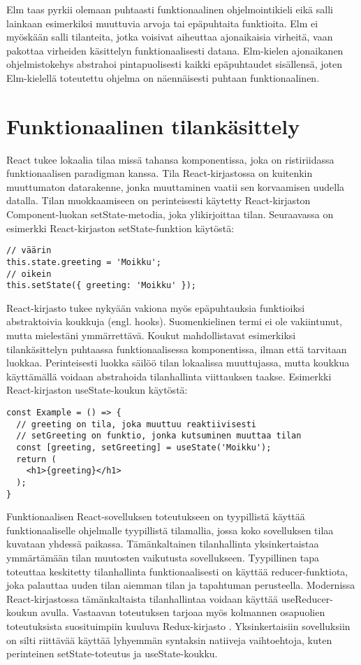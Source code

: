 Elm taas pyrkii olemaan puhtaasti funktionaalinen ohjelmointikieli eikä salli lainkaan esimerkiksi muuttuvia arvoja tai
epäpuhtaita funktioita. Elm ei myöskään salli tilanteita, jotka voisivat aiheuttaa ajonaikaisia virheitä, vaan pakottaa
virheiden käsittelyn funktionaalisesti datana. Elm-kielen ajonaikanen ohjelmistokehys abstrahoi pintapuolisesti kaikki
epäpuhtaudet sisällensä, joten Elm-kielellä toteutettu ohjelma on näennäisesti puhtaan funktionaalinen. \cite{elmlang}

\section{Funktionaalinen tilankäsittely}
React tukee lokaalia tilaa missä tahansa komponentissa, joka on ristiriidassa funktionaalisen paradigman kanssa. Tila
React-kirjastossa on kuitenkin muuttumaton datarakenne, jonka muuttaminen vaatii sen korvaamisen uudella datalla. Tilan
muokkaamiseen on perinteisesti käytetty React-kirjaston Component-luokan setState-metodia, joka ylikirjoittaa tilan.
Seuraavassa on esimerkki React-kirjaston setState-funktion käytöstä:
\begin{verbatim}
// väärin
this.state.greeting = 'Moikku';
// oikein
this.setState({ greeting: 'Moikku' });
\end{verbatim}
React-kirjasto tukee nykyään vakiona myös epäpuhtauksia funktioiksi abstraktoivia koukkuja (engl. hooks). Suomenkielinen
termi ei ole vakiintunut, mutta mielestäni ymmärrettävä. Koukut mahdollistavat esimerkiksi tilankäsittelyn puhtaassa
funktionaalisessa komponentissa, ilman että tarvitaan luokkaa. Perinteisesti luokka säilöö tilan lokaalissa muuttujassa,
mutta koukkua käyttämällä voidaan abstrahoida tilanhallinta viittauksen taakse. Esimerkki React-kirjaston
useState-koukun käytöstä:
\begin{verbatim}
const Example = () => {
  // greeting on tila, joka muuttuu reaktiivisesti
  // setGreeting on funktio, jonka kutsuminen muuttaa tilan
  const [greeting, setGreeting] = useState('Moikku');
  return (
    <h1>{greeting}</h1>
  );
}
\end{verbatim}

Funktionaalisen React-sovelluksen toteutukseen on tyypillistä käyttää funktionaaliselle ohjelmalle tyypillistä
tilamallia, jossa koko sovelluksen tilaa kuvataan yhdessä paikassa. Tämänkaltainen tilanhallinta yksinkertaistaa
ymmärtämään tilan muutosten vaikutusta sovellukseen. Tyypillinen tapa toteuttaa keskitetty tilanhallinta
funktionaalisesti on käyttää reducer-funktiota, joka palauttaa uuden tilan aiemman tilan ja tapahtuman perusteella.
Modernissa React-kirjastossa tämänkaltaista tilanhallintaa voidaan käyttää useReducer-koukun avulla. Vastaavan
toteutuksen tarjoaa myös kolmannen osapuolien toteutuksista suosituimpiin kuuluva Redux-kirjasto
\cite{functionalwebdev}. Yksinkertaisiin sovelluksiin on silti riittävää käyttää lyhyemmän syntaksin natiiveja
vaihtoehtoja, kuten perinteinen setState-toteutus ja useState-koukku. \cite{reactjs}

